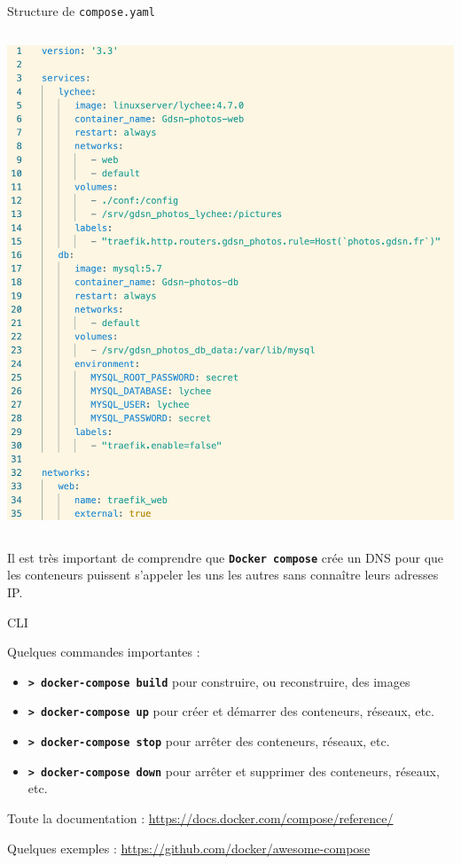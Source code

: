 \documentclass[aspectratio=169,10pt]{beamer}
\begin{document}
\begin{frame}{Structure de \texttt{compose.yaml}}
\begin{columns}[T,onlytextwidth]
\begin{column}{.5\linewidth}
\begin{center}
            \includegraphics[scale=0.25]{images/docker_compose_code.png}
        \end{center}
    \end{column}
\end{columns}

Il est très important de comprendre que \texttt{\textbf{Docker compose}} crée un DNS pour que les conteneurs puissent s'appeler les uns les autres sans connaître leurs adresses IP.

\end{frame}


\begin{frame}{CLI}

Quelques commandes importantes :
\begin{itemize}
    \item \texttt{\textbf{> docker-compose build}} pour construire, ou reconstruire, des images
    \item \texttt{\textbf{> docker-compose up}} pour créer et démarrer des conteneurs, réseaux, etc.
    \item \texttt{\textbf{> docker-compose stop}} pour arrêter des conteneurs, réseaux, etc.
    \item \texttt{\textbf{> docker-compose down}} pour arrêter et supprimer des conteneurs, réseaux, etc.
\end{itemize}
        
Toute la documentation : \url{https://docs.docker.com/compose/reference/}

Quelques exemples : \url{https://github.com/docker/awesome-compose}

\end{frame}

\end{document}
